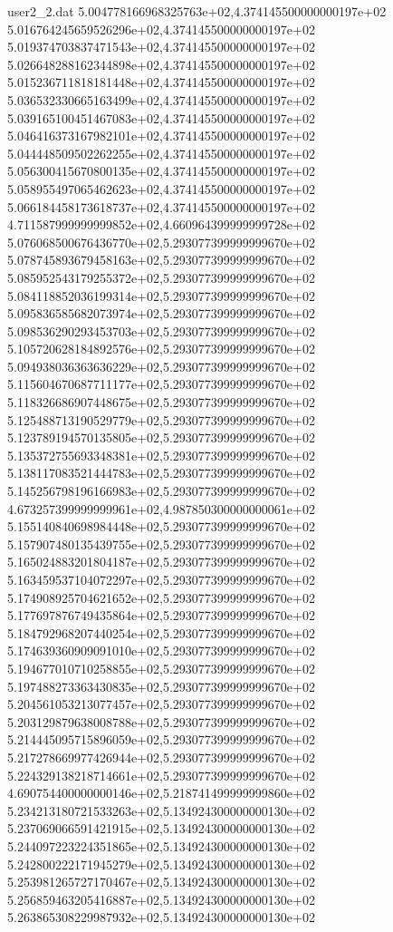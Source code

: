\begin{filecontents}{user2_2.dat}
5.004778166968325763e+02,4.374145500000000197e+02
5.016764245659526296e+02,4.374145500000000197e+02
5.019374703837471543e+02,4.374145500000000197e+02
5.026648288162344898e+02,4.374145500000000197e+02
5.015236711818181448e+02,4.374145500000000197e+02
5.036532330665163499e+02,4.374145500000000197e+02
5.039165100451467083e+02,4.374145500000000197e+02
5.046416373167982101e+02,4.374145500000000197e+02
5.044448509502262255e+02,4.374145500000000197e+02
5.056300415670800135e+02,4.374145500000000197e+02
5.058955497065462623e+02,4.374145500000000197e+02
5.066184458173618737e+02,4.374145500000000197e+02
4.711587999999999852e+02,4.660964399999999728e+02
5.076068500676436770e+02,5.293077399999999670e+02
5.078745893679458163e+02,5.293077399999999670e+02
5.085952543179255372e+02,5.293077399999999670e+02
5.084118852036199314e+02,5.293077399999999670e+02
5.095836585682073974e+02,5.293077399999999670e+02
5.098536290293453703e+02,5.293077399999999670e+02
5.105720628184892576e+02,5.293077399999999670e+02
5.094938036363636229e+02,5.293077399999999670e+02
5.115604670687711177e+02,5.293077399999999670e+02
5.118326686907448675e+02,5.293077399999999670e+02
5.125488713190529779e+02,5.293077399999999670e+02
5.123789194570135805e+02,5.293077399999999670e+02
5.135372755693348381e+02,5.293077399999999670e+02
5.138117083521444783e+02,5.293077399999999670e+02
5.145256798196166983e+02,5.293077399999999670e+02
4.673257399999999961e+02,4.987850300000000061e+02
5.155140840698984448e+02,5.293077399999999670e+02
5.157907480135439755e+02,5.293077399999999670e+02
5.165024883201804187e+02,5.293077399999999670e+02
5.163459537104072297e+02,5.293077399999999670e+02
5.174908925704621652e+02,5.293077399999999670e+02
5.177697876749435864e+02,5.293077399999999670e+02
5.184792968207440254e+02,5.293077399999999670e+02
5.174639360909091010e+02,5.293077399999999670e+02
5.194677010710258855e+02,5.293077399999999670e+02
5.197488273363430835e+02,5.293077399999999670e+02
5.204561053213077457e+02,5.293077399999999670e+02
5.203129879638008788e+02,5.293077399999999670e+02
5.214445095715896059e+02,5.293077399999999670e+02
5.217278669977426944e+02,5.293077399999999670e+02
5.224329138218714661e+02,5.293077399999999670e+02
4.690754400000000146e+02,5.218741499999999860e+02
5.234213180721533263e+02,5.134924300000000130e+02
5.237069066591421915e+02,5.134924300000000130e+02
5.244097223224351865e+02,5.134924300000000130e+02
5.242800222171945279e+02,5.134924300000000130e+02
5.253981265727170467e+02,5.134924300000000130e+02
5.256859463205416887e+02,5.134924300000000130e+02
5.263865308229987932e+02,5.134924300000000130e+02

\end{filecontents}
